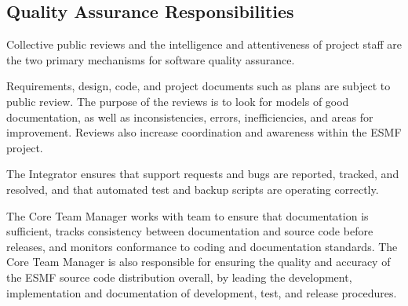 \subsection{Quality Assurance Responsibilities}

Collective public reviews and the intelligence and attentiveness of
project staff are the two primary mechanisms for software quality assurance.  

Requirements, design, code, and project documents such as plans
are subject to public review.  The purpose of the reviews is
to look for models of good documentation, as well as inconsistencies,
errors, inefficiencies, and areas for improvement.  Reviews also
increase coordination and awareness within the ESMF project.

The Integrator ensures that support requests
and bugs are reported, tracked, and resolved, and that automated
test and backup scripts are operating correctly.

The Core Team Manager works with team to ensure that documentation
is sufficient, tracks consistency between documentation and source
code before releases, and monitors conformance to coding and
documentation standards.  The Core Team Manager is also responsible
for ensuring the quality and accuracy of the ESMF source code
distribution overall, by leading the development,
implementation and documentation of development, test, and release
procedures.










